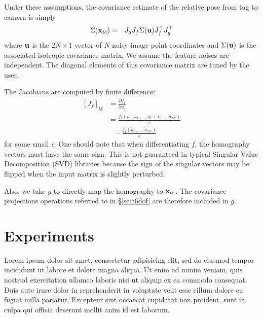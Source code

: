 \documentclass[conference]{IEEEtran}
\begin{document}
Under these assumptions, the covariance estimate of the relative pose from tag to camera
is simply
\begin{eqnarray*}
  \Sigma({{\bf x}_{tc}}) & = & J_g J_f \Sigma({\bf u}) J_f^\top J_g^\top
\end{eqnarray*}
where ${\bf u}$ is the $2N \times 1$ vector of $N$ noisy image point coordinates and
$\Sigma({\bf u})$ is the associated isotropic covariance matrix.  We assume the feature
noises are independent. The diagonal elements of this covariance matrix are tuned by the
user.

The Jacobians are computed by finite difference:
\begin{align*}
  \left[J_f\right]_{ij} &=\frac{\partial f_i}{\partial u_j} \\
  &= \frac{f_i(u_0, u_1, \dots, u_i +
    \epsilon, \dots, u_{2N})}{\epsilon} \\
  & \ \ \  - \frac{f_i(u_0, \dots, u_{2N})}{\epsilon}
\end{align*}
for some small $\epsilon$. One should note that when differentiating $f$, the homography
vectors must have the same sign.  This is not guaranteed in typical Singular Value
Decomposition (SVD) libraries because the sign of the singular vectors may be flipped when
the input matrix is slightly perturbed.

Also, we take $g$ to directly map the homography to ${\bf x}_{tc}$.  The covariance
projections operations referred to in \S\ref{sec:6dof} are therefore included in $g$.




\section{Experiments}
\label{sec:experiments}

Lorem ipsum dolor sit amet, consectetur adipisicing elit, sed do eiusmod tempor incididunt
ut labore et dolore magna aliqua. Ut enim ad minim veniam, quis nostrud exercitation
ullamco laboris nisi ut aliquip ex ea commodo consequat. Duis aute irure dolor in
reprehenderit in voluptate velit esse cillum dolore eu fugiat nulla pariatur. Excepteur
sint occaecat cupidatat non proident, sunt in culpa qui officia deserunt mollit anim id
est laborum.
\end{document}
